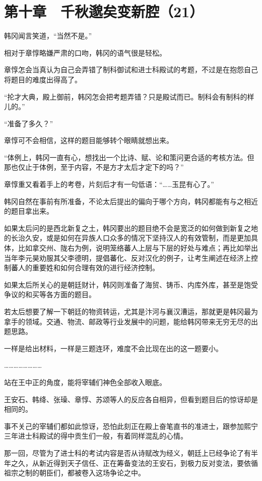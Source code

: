 \section{第十章　千秋邈矣变新腔（21）}

韩冈闻言笑道，“当然不是。”

相对于章惇略嫌严肃的口吻，韩冈的语气很是轻松。

章惇怎会当真认为自己会弄错了制科御试和进士科殿试的考题，不过是在抱怨自己将题目的难度出得高了。

“抡才大典，殿上御前，韩冈怎会把考题弄错？只是殿试而已。制科会有制科的样儿的。”

“准备了多久？”

章惇可不会相信，这样的题目能够转个眼睛就想出来。

“体例上，韩冈一直有心，想找出一个比诗、赋、论和策问更合适的考核方法。但那也仅止于体例，至于内容，不是方才太后才定下的吗？”

章惇重又看着手上的考卷，片刻后才有一句低语：“……玉昆有心了。”

韩冈自然在事前有所准备，不论太后提出的偏向于哪个方向，韩冈都能有与之相近的题目拿出来。

如果太后问的是西北新复之土，韩冈要出的题目绝不会是宽泛的如何做到新复之地的长治久安，或是如何在异族人口众多的情况下坚持汉人的有效管制，而是更加具体，比如拿交州、陇右为例，说明笼络蕃人上层与下层的好处与难点；再比如举出当年李元昊劝服其父李德明，提倡蕃化、反对汉化的例子，让考生阐述在经济上控制蕃人的重要姓和如何合理有效的进行经济控制。

如果太后所关心的是朝廷财计，韩冈则准备了海贸、铸币、内库外库，甚至是饱受争议的和买等各方面的题目。

若太后想要了解一下朝廷的物资转运，尤其是汴河与襄汉漕运，那就更是韩冈最为拿手的领域。交通、物流、邮政等行业发展中的问题，能给韩冈带来无穷无尽的出题思路。

一样是给出材料，一样是三题连环，难度不会比现在出的这一题要小。

……………………

站在王中正的角度，能将宰辅们神色全部收入眼底。

王安石、韩绛、张璪、章惇、苏颂等人的反应各自相异，但看到题目后的惊讶却是相同的。

事不关己的宰辅们都如此惊讶，恐怕此刻正在殿上奋笔直书的准进士，跟参加熙宁三年进士科殿试的得中贡生们一般，有着同样混乱的心情。

那一回，尽管为了进士科的考试内容是否从诗赋改为经义，朝廷上已经争论了有半年之久，从新近得到天子信任、正在筹备变法的王安石，到极力反对变法，要依循祖宗之制的朝臣们，都被卷入这场争论之中。

